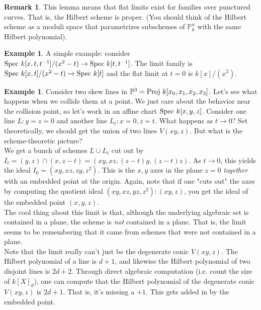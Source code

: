 \documentclass[10pt,reqno]{amsart}
\theoremstyle{definition}
\newtheorem{example}[theorem]{Example}
\newtheorem{remark}[theorem]{Remark}
\theoremstyle{remark}
\numberwithin{equation}{section}
\numberwithin{theorem}{section}
\newcommand{\spec}{\textup{Spec }}
\newcommand{\proj}{\textup{Proj }}
\newcommand{\PP}{{\mathbb P}}
\begin{document}
\begin{remark} This lemma means that flat limits exist for families over punctured curves. That is, the Hilbert scheme is proper. (You should think of the Hilbert scheme as a moduli space that parametrizes subschemes of $\PP^n_k$ with the same Hilbert polynomial).
\end{remark}

\begin{example} A simple example: consider $\spec k[x,t,t^{-1}]/(x^2-t) \to \spec k[t,t^{-1}]$. The limit family is $\spec k[x,t]/(x^2-t) \to \spec k[t]$ and the flat limit at $t=0$ is  $k[x]/(x^2)$.
\end{example}

\begin{example} Consider two skew lines in $\PP^3 = \proj k[x_0,x_1,x_2,x_3]$. Let's see what happens when we collide them at a point. We just care about the behavior near the collision point, so let's work in an affine chart $\spec k[x,y,z]$. Consider one line $L: y=z=0$ and another line $L_t: x=0,z=t$. What happens as $t \to 0$? Set theoretically, we should get the union of two lines $V(xy,z)$. But what is the scheme-theoretic picture?
\\

We get a bunch of schemes $L \cup L_t$ cut out by $I_t = (y,z) \cap (x,z-t) = (xy,xz,(z-t)y,(z-t)z)$. As $t \to 0$, this yields the ideal $I_0 = (xy,xz,zy,z^2)$. This is the $x,y$ axes in the plane $z=0$ \textit{together} with an embedded point at the origin. Again, note that if one "cuts out" the axes by computing the quotient ideal $(xy,xz,yz,z^2):(xy,z)$, you get the ideal of the embedded point $(x,y,z)$.
\\

The cool thing about this limit is that, although the underlying algebraic set is contained in a plane, the scheme is \textit{not} contained in a plane. That is, the limit seems to be remembering that it came from schemes that were not contained in a plane. 
\\

Note that the limit really can't just be the degenerate conic $V(xy,z)$. The Hilbert polynomial of a line is $d+1$, and likewise the Hilbert polynomial of two disjoint lines is $2d+2$. Through direct algebraic computation (i.e. count the size of $k[X]_d$), one can compute that the Hilbert polynomial of the degenerate conic $V(xy,z)$ is $2d+1$. That is, it's missing a $+1$. This gets added in by the embedded point.
\end{example}
\end{document}
